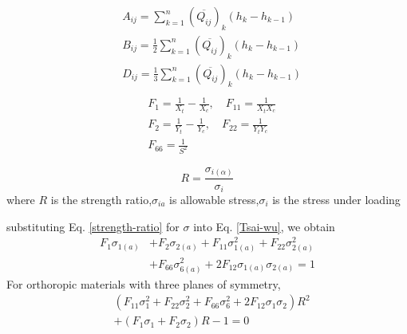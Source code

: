 \documentclass[smallextended]{svjour3}       %
\begin{document}
\begin{equation}
    \begin{split}
    &A_{ij}
	=
	\sum_{k=1}^n(\overline{Q_{ij}})_k(h_k-h_{k-1}) \\
    &B_{ij}
	=
	\frac{1}{2}\sum_{k=1}^n(\overline{Q_{ij}})_k(h_k-h_{k-1}) \\
    &D_{ij}
	=
	\frac{1}{3}\sum_{k=1}^n(\overline{Q_{ij}})_k(h_k-h_{k-1}) \\
    \end{split}
\end{equation}
\begin{equation}
    \begin{split}
    &F_{1}=\frac{1}{X_t}-\frac{1}{X_c},\quad  F_{11}=\frac{1}{X_tX_c} \\
    &F_{2}=\frac{1}{Y_t}-\frac{1}{Y_c},\quad  F_{22}=\frac{1}{Y_tY_c} \\
    &F_{66}=\frac{1}{S^2}
   \end{split}
\end{equation}

\begin{equation*}\label{strength-ratio}
    R=\frac{\sigma_{i(\alpha)}}{\sigma_i}
\end{equation*}
where $R$ is the strength ratio,$\sigma_{i{a}}$ is allowable stress,$\sigma_i$ is the stress under loading

substituting Eq.  \ref{strength-ratio} for $\sigma$ into Eq. \ref{Tsai-wu}, we obtain
\begin{equation*}
	\begin{split}
		F_1\sigma_{1(a)}&+F_2\sigma_{2(a)}+F_{11}\sigma_{1(a)}^2+F_{22}\sigma_{2(a)}^2 \\
						&+F_{66}\sigma_{6(a)}^2+2F_{12}\sigma_{1(a)}\sigma_{2(a)}=1
    \end{split}
\end{equation*}
For orthoropic materials with three planes of symmetry, 
\begin{equation*}\label{Tsai-wu}
	\begin{split}
		&(F_{11}\sigma_1^2+F_{22}\sigma_2^2+F_{66}\sigma_6^2+2F_{12}\sigma_1\sigma_2)R^2 \\
		&+(F_1\sigma_1+F_2\sigma_2)R-1=0 
    \end{split}
\end{equation*}
\end{document}
